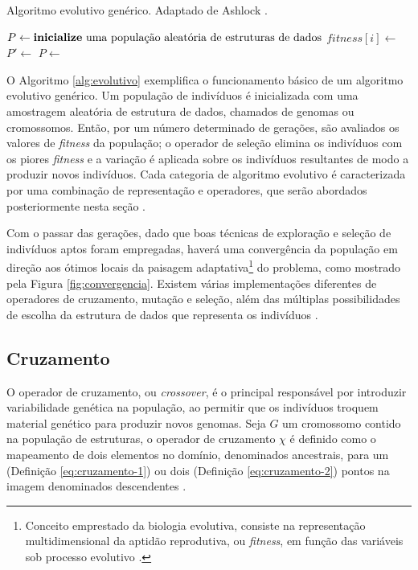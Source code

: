 \documentclass[
	12pt,				%
	openright,			%
	twoside,			%
	a4paper,			%
	tcc,			%
	]{ABNT-DC-UEL}
\newenvironment{algoritmo}[1][] {
    \begin{algorithm}[#1]
         \selectlanguage{portuguese}
         \floatname{algorithm}{Algoritmo}
         \renewcommand{\algorithmicprocedure}{\textbf{procedimento}}
         \renewcommand{\algorithmicrequire}{\textbf{Dados:}}
         \renewcommand{\algorithmicensure}{\textbf{Saída:}}
         \renewcommand{\algorithmicfunction}{\textbf{função}}
         \renewcommand{\algorithmicif}{\textbf{se}}
         \renewcommand{\algorithmicthen}{\textbf{então}}
         \renewcommand{\algorithmicelse}{\textbf{senão}}
         \renewcommand{\algorithmicforall}{\textbf{para todo}}
         \renewcommand{\algorithmicfor}{\textbf{para}}
         \renewcommand{\algorithmicrepeat}{\textbf{repita}}
         \renewcommand{\algorithmicuntil}{\textbf{até}}
         \renewcommand{\algorithmicloop}{\textbf{repita}}
         \renewcommand{\algorithmicwhile}{\textbf{enquanto}}
         \renewcommand{\algorithmicdo}{\textbf{faça}}
         \renewcommand{\algorithmicend}{\textbf{fim}}
         \renewcommand{\algorithmicreturn}{\textbf{retorne}}
      }
      {\end{algorithm}
}
\begin{document}
\begin{algoritmo}[htb]
    \begin{algorithmic}
        \caption{Algoritmo evolutivo genérico. Adaptado de Ashlock \cite{ashlock:06}.}
            \State $P \gets \text{\textbf{inicialize} uma população aleatória de estruturas de dados}$
            \Repeat
                    \State $\textit{fitness}[i] \gets$ 
                \EndFor
                \State $P' \gets$ 
                \State $P \gets$ 
        \EndProcedure
        \label{alg:evolutivo}
    \end{algorithmic}
\end{algoritmo}

O Algoritmo \ref{alg:evolutivo} exemplifica o funcionamento básico de um algoritmo evolutivo genérico. Um população de indivíduos é inicializada com uma amostragem aleatória de estrutura de dados, chamados de genomas ou cromossomos. Então, por um número determinado de gerações, são avaliados os valores de \textit{fitness} da população; o operador de seleção elimina os indivíduos com os piores \textit{fitness} e a variação é aplicada sobre os indivíduos resultantes de modo a produzir novos indivíduos. Cada categoria de algoritmo evolutivo é caracterizada por uma combinação de representação e operadores, que serão abordados posteriormente nesta seção \cite{ashlock:06, eiben:15}.

Com o passar das gerações, dado que boas técnicas de exploração e seleção de indivíduos aptos foram empregadas, haverá uma convergência da população em direção aos ótimos locais da paisagem adaptativa\footnote[1]{Conceito emprestado da biologia evolutiva, consiste na representação multidimensional da aptidão reprodutiva, ou \textit{fitness}, em função das variáveis sob processo evolutivo \cite{eiben:15}.} do problema, como mostrado pela Figura \ref{fig:convergencia}. Existem várias implementações diferentes de operadores de cruzamento, mutação e seleção, além das múltiplas possibilidades de escolha da estrutura de dados que representa os indivíduos \cite{back:00, eiben:15}.

\subsection{Cruzamento}

O operador de cruzamento, ou \textit{crossover}, é o principal responsável por introduzir variabilidade genética na população, ao permitir que os indivíduos troquem material genético para produzir novos genomas. Seja $G$ um cromossomo contido na população de estruturas, o operador de cruzamento $\chi$ é definido como o mapeamento de dois elementos no domínio, denominados ancestrais, para um (Definição \ref{eq:cruzamento-1}) ou dois (Definição \ref{eq:cruzamento-2}) pontos na imagem denominados descendentes \cite{ashlock:06}.
\end{document}
